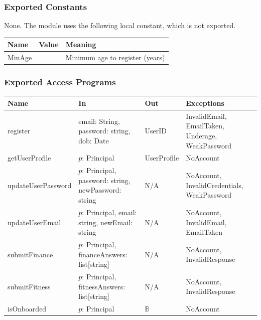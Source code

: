 \documentclass[12pt, titlepage]{article}
\begin{document}
\subsubsection{Exported Constants}

None. The module uses the following local constant, which is not exported.\\

\begin{tabularx}{\textwidth}{
  >{\raggedright\arraybackslash}p{3.4cm}
  >{\raggedright\arraybackslash}p{3cm}
  >{\raggedright\arraybackslash}X}
\toprule
\textbf{Name} & \textbf{Value} &\textbf{Meaning}\\
\midrule
MinAge & 18 & Minimum age to register (years)\\
\bottomrule
\end{tabularx}

\subsubsection{Exported Access Programs}

\begin{center}
\small
\renewcommand{\arraystretch}{1.2}
\begin{tabularx}{\textwidth}{
  >{\raggedright\arraybackslash}p{3.8cm}
  >{\raggedright\arraybackslash}X
  >{\raggedright\arraybackslash}p{2.6cm}
  >{\raggedright\arraybackslash}p{4.4cm}}
\hline
\textbf{Name} & \textbf{In} & \textbf{Out} & \textbf{Exceptions} \\
\hline
register & email: String, password: string, dob: Date & UserID & InvalidEmail, EmailTaken, Underage, WeakPassword \\
getUserProfile & $p$: Principal & UserProfile & NoAccount \\
updateUserPassword & $p$: Principal, password: string, newPassword: string & N/A & NoAccount, InvalidCredentials, WeakPassword \\
updateUserEmail & $p$: Principal, email: string, newEmail: string & N/A & NoAccount, InvalidEmail, EmailTaken \\
submitFinance & $p$: Principal, financeAnswers: list[string] & N/A & NoAccount, InvalidResponse \\
submitFitness & $p$: Principal, fitnessAnswers: list[string] & N/A & NoAccount, InvalidResponse \\
isOnboarded & $p$: Principal & $\mathbb{B}$ & NoAccount \\
\hline
\end{tabularx}
\end{center}
\end{document}
